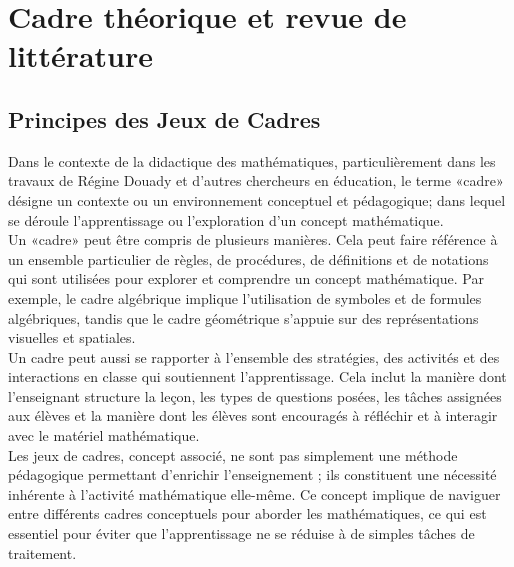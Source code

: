 \section{Cadre théorique et revue de littérature}
\subsection{Principes des Jeux de Cadres}

Dans le contexte de la didactique des mathématiques,
particulièrement dans les travaux de Régine Douady et d'autres chercheurs en éducation,
le terme «cadre» désigne un contexte ou un environnement conceptuel et pédagogique;
dans lequel se déroule l'apprentissage ou l'exploration d'un concept mathématique.\\

Un «cadre» peut être compris de plusieurs manières.
Cela peut faire référence à un ensemble particulier de règles,
de procédures,
de définitions et de notations qui sont utilisées pour explorer et comprendre un concept mathématique.
Par exemple,
le cadre algébrique implique l'utilisation de symboles et de formules algébriques,
tandis que le cadre géométrique s'appuie sur des représentations visuelles et spatiales.\\

Un cadre peut aussi se rapporter à l'ensemble des stratégies,
des activités et des interactions en classe qui soutiennent l'apprentissage.
Cela inclut la manière dont l'enseignant structure la leçon,
les types de questions posées,
les tâches assignées aux élèves et la manière dont les élèves sont encouragés à réfléchir et à interagir avec le matériel mathématique.\\


Les jeux de cadres,
concept associé,
ne sont pas simplement une méthode pédagogique permettant d'enrichir l'enseignement ;
ils constituent une nécessité inhérente à l'activité mathématique elle-même.
Ce concept implique de naviguer entre différents cadres conceptuels pour aborder les mathématiques,
ce qui est essentiel pour éviter que l'apprentissage ne se réduise à de simples tâches de traitement.\\

